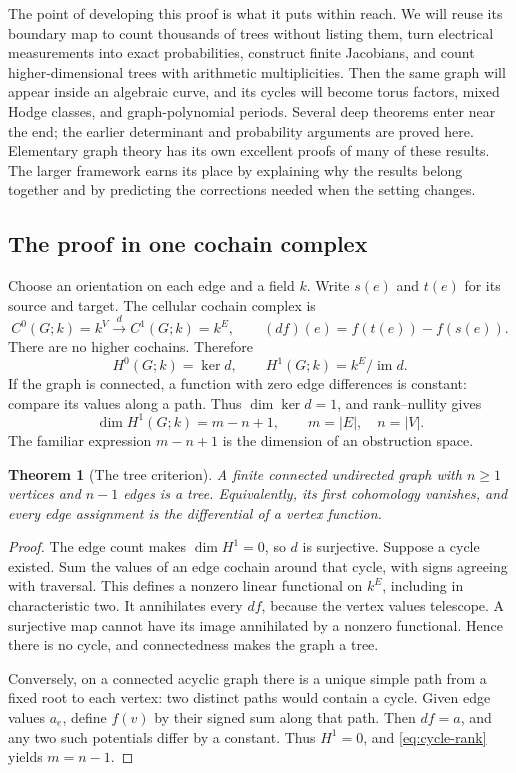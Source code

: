 \documentclass[11pt]{article}
\newtheorem{theorem}{Theorem}[section]
\theoremstyle{definition}
\theoremstyle{remark}
\begin{document}
The point of developing this proof is what it puts within reach. We will reuse its boundary map to count thousands of trees without listing them, turn electrical measurements into exact probabilities, construct finite Jacobians, and count higher-dimensional trees with arithmetic multiplicities. Then the same graph will appear inside an algebraic curve, and its cycles will become torus factors, mixed Hodge classes, and graph-polynomial periods. Several deep theorems enter near the end; the earlier determinant and probability arguments are proved here. Elementary graph theory has its own excellent proofs of many of these results. The larger framework earns its place by explaining why the results belong together and by predicting the corrections needed when the setting changes.

\subsection{The proof in one cochain complex}

Choose an orientation on each edge and a field \(k\). Write \(s(e)\) and \(t(e)\) for its source and target. The cellular cochain complex is
\[
 C^0(G;k)=k^V\xrightarrow{d}C^1(G;k)=k^E,
 \qquad (df)(e)=f(t(e))-f(s(e)).
\]
There are no higher cochains. Therefore
\[
 H^0(G;k)=\ker d,\qquad H^1(G;k)=k^E/\operatorname{im}d.
\]
If the graph is connected, a function with zero edge differences is constant: compare its values along a path. Thus \(\dim\ker d=1\), and rank--nullity gives
\begin{equation}\label{eq:cycle-rank}
 \dim H^1(G;k)=m-n+1,
 \qquad m=|E|,\quad n=|V|.
\end{equation}
The familiar expression \(m-n+1\) is the dimension of an obstruction space.

\begin{theorem}[The tree criterion]\label{thm:tree}
A finite connected undirected graph with \(n\ge1\) vertices and \(n-1\) edges is a tree. Equivalently, its first cohomology vanishes, and every edge assignment is the differential of a vertex function.
\end{theorem}
\begin{proof}
The edge count makes \(\dim H^1=0\), so \(d\) is surjective. Suppose a cycle existed. Sum the values of an edge cochain around that cycle, with signs agreeing with traversal. This defines a nonzero linear functional on \(k^E\), including in characteristic two. It annihilates every \(df\), because the vertex values telescope. A surjective map cannot have its image annihilated by a nonzero functional. Hence there is no cycle, and connectedness makes the graph a tree.

Conversely, on a connected acyclic graph there is a unique simple path from a fixed root to each vertex: two distinct paths would contain a cycle. Given edge values \(a_e\), define \(f(v)\) by their signed sum along that path. Then \(df=a\), and any two such potentials differ by a constant. Thus \(H^1=0\), and \eqref{eq:cycle-rank} yields \(m=n-1\).
\end{proof}
\end{document}
